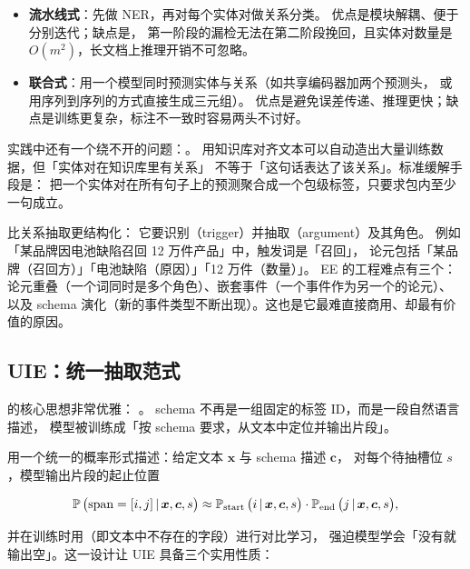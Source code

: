 \begin{itemize}
  \item \textbf{流水线式}：先做 NER，再对每个实体对做关系分类。
        优点是模块解耦、便于分别迭代；缺点是，
        第一阶段的漏检无法在第二阶段挽回，且实体对数量是 $O(m^2)$，长文档上推理开销不可忽略。
  \item \textbf{联合式}：用一个模型同时预测实体与关系（如共享编码器加两个预测头，
        或用序列到序列的方式直接生成三元组）。
        优点是避免误差传递、推理更快；缺点是训练更复杂，标注不一致时容易两头不讨好。
\end{itemize}

实践中还有一个绕不开的问题：。
用知识库对齐文本可以自动造出大量训练数据，但「实体对在知识库里有关系」
不等于「这句话表达了该关系」。标准缓解手段是：
把一个实体对在所有句子上的预测聚合成一个包级标签，只要求包内至少一句成立。

 比关系抽取更结构化：
它要识别（trigger）并抽取（argument）及其角色。
例如「某品牌因电池缺陷召回 12 万件产品」中，触发词是「召回」，
论元包括「某品牌（召回方）」「电池缺陷（原因）」「12 万件（数量）」。
EE 的工程难点有三个：论元重叠（一个词同时是多个角色）、嵌套事件（一个事件作为另一个的论元）、
以及 schema 演化（新的事件类型不断出现）。这也是它最难直接商用、却最有价值的原因。

\subsection{UIE：统一抽取范式}

 的核心思想非常优雅：
。
schema 不再是一组固定的标签 ID，而是一段自然语言描述，
模型被训练成「按 schema 要求，从文本中定位并输出片段」。

用一个统一的概率形式描述：给定文本 $\bm{x}$ 与 schema 描述 $\bm{c}$，
对每个待抽槽位 $s$，模型输出片段的起止位置

\begin{equation}
\operatorname{\mathbb{P}}\big(\text{span} = [i, j] \,\vert\, \bm{x}, \bm{c}, s\big)
\approx \operatorname{\mathbb{P}}_{\text{start}}\big(i \,\vert\, \bm{x}, \bm{c}, s\big) \cdot
\operatorname{\mathbb{P}}_{\text{end}}\big(j \,\vert\, \bm{x}, \bm{c}, s\big),
\label{eq:uie}
\end{equation}

并在训练时用（即文本中不存在的字段）进行对比学习，
强迫模型学会「没有就输出空」。这一设计让 UIE 具备三个实用性质：

